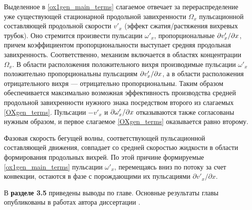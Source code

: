 Выделенное в \eqref{ox1gen_main_terms} слагаемое отвечает за перераспределение уже существующей стационарной продольной завихренности $\Omega_x$ пульсационной составляющей продольной скорости $v'_x$ (эффект сжатия/растяжения вихревых трубок). Оно стремится произвести пульсации $\omega'_x$, пропорциональные $\partial v'_x / \partial x$, причем коэффициентом пропорциональности выступает средняя продольная завихренность. Соответственно, механизм включается в областях концентрации~$\Omega_x$. В области расположения положительного вихря производимые пульсации $\omega'_x$ положительно пропорциональны пульсациям $\partial v'_x / \partial x$, а в области расположения отрицательного вихря --- отрицательно пропорциональны. Таким образом обеспечивается максимально возможная эффективность производства средней продольной завихренности нужного знака посредством второго из слагаемых \eqref{OXgen_terms}. Пульсации $-v'_x$ и $\partial \omega'_x / \partial x$ отказываются также согласованы нужным образом, и первое слагаемое \eqref{OXgen_terms} оказывается равно второму.

Фазовая скорость бегущей волны, соответствующей пульсационной составляющей движения, совпадает со средней скоростью жидкости в области формирования продольных вихрей. По этой причине формируемые \eqref{ox1gen_main_terms} пульсации $\omega'_x$, перемещаясь вниз по потоку за счет конвекции, остаются в фазе с порождающими их пульсациями $\partial v'_x / \partial x$.

В \textbf{разделе 3.5} приведены выводы по главе. Основные результаты главы опубликованы в работах автора диссертации  \cite{MZG2017, Lomonosov2018, Ob2018}.

 
